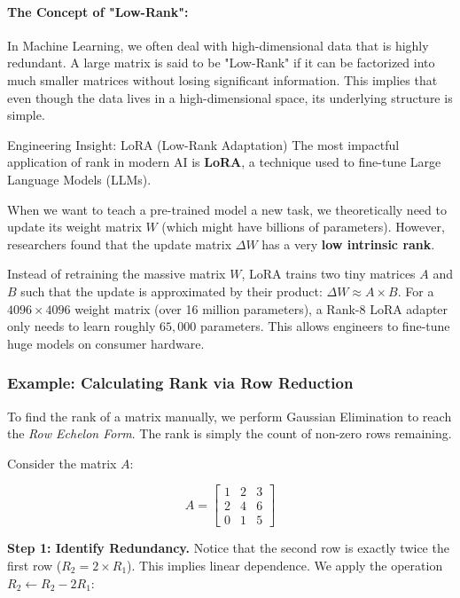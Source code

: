 \documentclass[12pt,a4paper,twoside,openright]{book}
\begin{document}
\paragraph{The Concept of "Low-Rank":}
In Machine Learning, we often deal with high-dimensional data that is highly redundant. A large matrix is said to be "Low-Rank" if it can be factorized into much smaller matrices without losing significant information. This implies that even though the data lives in a high-dimensional space, its underlying structure is simple.

\begin{unibobox}{Engineering Insight: LoRA (Low-Rank Adaptation)}
The most impactful application of rank in modern AI is \textbf{LoRA}, a technique used to fine-tune Large Language Models (LLMs).

When we want to teach a pre-trained model a new task, we theoretically need to update its weight matrix $W$ (which might have billions of parameters). However, researchers found that the update matrix $\Delta W$ has a very \textbf{low intrinsic rank}.

Instead of retraining the massive matrix $W$, LoRA trains two tiny matrices $A$ and $B$ such that the update is approximated by their product: $\Delta W \approx A \times B$.
For a $4096 \times 4096$ weight matrix (over 16 million parameters), a Rank-8 LoRA adapter only needs to learn roughly $65,000$ parameters. This allows engineers to fine-tune huge models on consumer hardware.
\end{unibobox}

\subsubsection*{Example: Calculating Rank via Row Reduction}

To find the rank of a matrix manually, we perform Gaussian Elimination to reach the \textit{Row Echelon Form}. The rank is simply the count of non-zero rows remaining.

Consider the matrix $A$:

\begin{equation*}
A = 
\begin{bmatrix}
1 & 2 & 3 \\
2 & 4 & 6 \\
0 & 1 & 5
\end{bmatrix}
\end{equation*}

\textbf{Step 1: Identify Redundancy.} 
Notice that the second row is exactly twice the first row ($R_2 = 2 \times R_1$). This implies linear dependence. We apply the operation $R_2 \leftarrow R_2 - 2R_1$:
\end{document}
